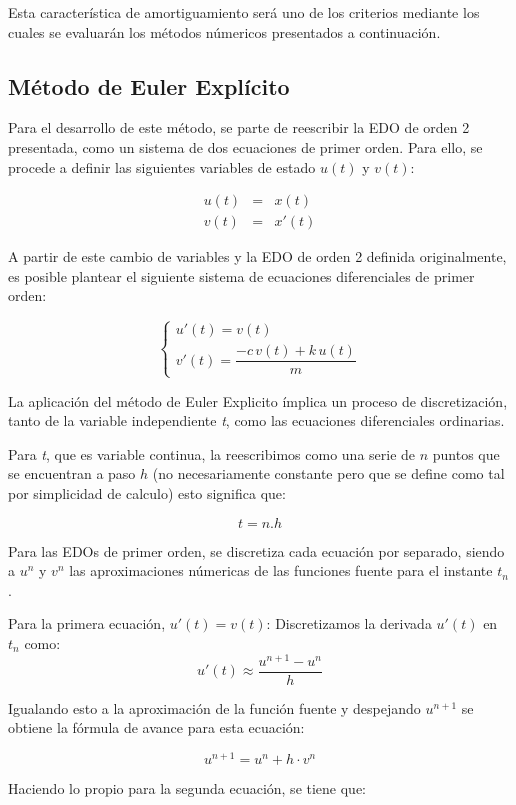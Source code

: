 \documentclass[titlepage,a4paper]{article}
\begin{document}
Esta característica de amortiguamiento será uno de los criterios mediante los cuales se evaluarán los métodos númericos presentados a continuación.

\subsection{Método de Euler Explícito}

Para el desarrollo de este método, se parte de reescribir la EDO de orden 2 presentada, como un sistema de dos ecuaciones de primer orden. Para ello, se procede a definir las siguientes variables de estado $u(t)$ y $v(t)$:

\[
\begin{array}{rcl}
u(t) &=& x(t) \\
v(t) &=& {x'}(t)
\end{array}
\]

A partir de este cambio de variables y la EDO de orden 2 definida originalmente, es posible plantear el siguiente sistema de ecuaciones diferenciales de primer orden:

\[
\begin{cases}
u'(t) = v(t) \\
v'(t) = \dfrac{-c\,v(t) + k\,u(t)}{m}
\end{cases}
\]

La aplicación del método de Euler Explicito ímplica un proceso de discretización, tanto de la variable independiente \textit{t}, como las ecuaciones diferenciales ordinarias. 

Para \textit{t}, que es variable continua, la reescribimos como una serie de $n$ puntos que se encuentran a paso $h$ (no necesariamente constante pero que se define como tal por simplicidad de calculo)  esto significa que:

\[
t = n . h
\]

Para las EDOs de primer orden, se discretiza cada ecuación por separado, siendo a $u^n$  y $v^n$ las aproximaciones númericas de las funciones fuente para el instante $t_n$.

Para la primera ecuación, $u'(t) = v(t)$: Discretizamos la derivada $u'(t)$ en $t_n$ como:
\[
u'(t) \approx \dfrac{u^{n+1} - u^n}{h}
\]

Igualando esto a la aproximación de la función fuente y despejando $u^{n+1}$ se obtiene la fórmula de avance para esta ecuación:

\[
u^{n+1} = u^n + h \cdot v^n
\]

Haciendo lo propio para la segunda ecuación, se tiene que:
\end{document}
